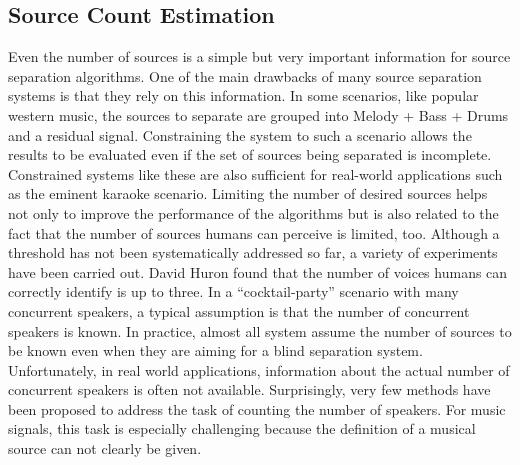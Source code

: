 \subsection{Source Count Estimation}
Even the number of sources is a simple but very important information for source separation algorithms. One of the main drawbacks of many source separation systems is that they rely on this information. In some scenarios, like popular western music, the sources to separate are grouped into Melody + Bass + Drums and a residual signal. Constraining the system to such a scenario allows the results to be evaluated even if the set of sources being separated is incomplete. Constrained systems like these are also sufficient for real-world applications such as the eminent karaoke scenario. Limiting the number of desired sources helps not only to improve the performance of the algorithms but is also related to the fact that the number of sources humans can perceive is limited, too. Although a threshold has not been systematically addressed so far, a variety of experiments have been carried out. David Huron found \cite{huron89} that the number of voices humans can correctly identify is up to three.
In a “cocktail-party” scenario with many concurrent speakers, a typical assumption is that the number of concurrent speakers is known.
In practice, almost all system assume the number of sources to be known even when they are aiming for a blind separation system.
Unfortunately, in real world applications, information about the actual number of concurrent speakers
is often not available.
Surprisingly, very few methods have been proposed to address the task of
counting the number of speakers.
For music signals, this task is especially challenging because the definition of a musical source can not clearly be given.

